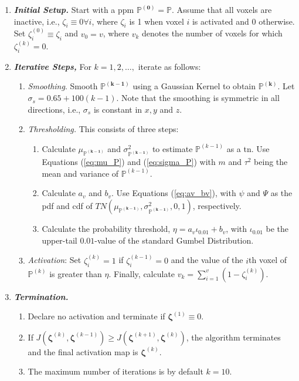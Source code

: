 \begin{enumerate}
\item \textbf{\textit{Initial Setup.}} Start with a \gls{ppm} 
$\bm{\mathbb{P}^{(0)}} = \bm{\mathbb{P}}$. Assume that all voxels are inactive, 
i.e., $\zeta_i \equiv 0 \forall i$, where $\zeta_i$ is 1 when voxel $i$ is 
activated and 0 otherwise. Set $\zeta_i^{(0)} \equiv \zeta_i$ and $v_0 = v$, where $v_k$ 
denotes the number of voxels for which $\zeta_i^{(k)} = 0$.
\item \textbf{\textit{Iterative Steps,}} For $k=1,2,\dots,$ iterate as follows:
\begin{enumerate}
\item \textit{Smoothing}. Smooth $\bm{\mathbb{P}^{(k-1)}}$ using a Gaussian Kernel 
to obtain $\bm{\mathbb{P}^{(k)}}$. Let $\sigma_s = 0.65 + 100(k-1)$. Note that the smoothing
is symmetric in all directions, i.e., $\sigma_s$ is constant in $x,y$ and $z$.
\item \textit{Thresholding.} This consists of three steps:
\begin{enumerate}
\item Calculate $\mu_{\bm{\mathbb{P}^{(k-1)}}}$ and $\sigma^2_{\bm{\mathbb{P}^{(k-1)}}}$ to 
estimate $\mathbb{P}^{(k-1)}$ as a \gls{tn}. Use Equations (\ref{eq:mu_P}) and 
(\ref{eq:sigma_P}) with $m$ and $\tau^2$ being the 
mean and variance of $\mathbb{P}^{(k-1)}$.
\item Calculate $a_v$ and $b_v$. Use Equations (\ref{eq:av_bv}), with $\psi$ and $\Psi$ as
 the \gls{pdf} and \gls{cdf} of 
 $TN\left( \mu_{\bm{\mathbb{P}^{(k-1)}}}, \sigma^2_{\bm{\mathbb{P}^{(k-1)}}}, 0,1 \right)$, 
 respectively.
\item Calculate the probability threshold, 
$\eta=a_v\iota_{0.01}+b_v$, with $\iota_{0.01}$ be the upper-tail 
$0.01$-value of the standard Gumbel Distribution.
\end{enumerate}
\item \textit{Activation}: Set $\zeta_i^{(k)} = 1$ if $\zeta_i^{(k-1)} = 0$ and the value 
of the $i$th voxel of $\mathbb{P}^{(k)}$ is greater than $\eta$. Finally, 
calculate $v_k=\sum_{i=1}^v\left(1-\zeta_i^{(k)}\right)$.
\end{enumerate}
\item \textbf{\textit{Termination.}}
\begin{enumerate}
\item Declare no activation and terminate if $\bm{\zeta}^{(1)} \equiv 0$.
\item If $J(\bm{\zeta}^{(k)},\bm{\zeta}^{(k-1)}) \geq J(\bm{\zeta}^{(k+1)},\bm{\zeta}^{(k)})$, the algorithm terminates and the final activation map is $\bm{\zeta}^{(k)}$.
\item The maximum number of iterations is by default $k=10$.
\end{enumerate}
\end{enumerate}